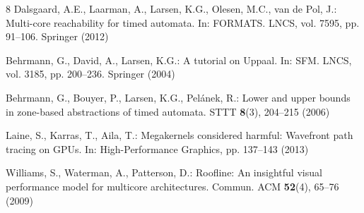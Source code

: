 \documentclass[11pt]{article}
\begin{document}
\begin{thebibliography}{8}
Dalsgaard, A.E., Laarman, A., Larsen, K.G., Olesen, M.C., van de Pol, J.:
Multi-core reachability for timed automata. In: FORMATS. LNCS, vol. 7595, pp. 91--106.
Springer (2012)

Behrmann, G., David, A., Larsen, K.G.: A tutorial on Uppaal. In: SFM. LNCS, vol. 3185,
pp. 200--236. Springer (2004)

Behrmann, G., Bouyer, P., Larsen, K.G., Pel\'{a}nek, R.: Lower and upper bounds in zone-based
abstractions of timed automata. STTT \textbf{8}(3), 204--215 (2006)

Laine, S., Karras, T., Aila, T.: Megakernels considered harmful: Wavefront path tracing on
GPUs. In: High-Performance Graphics, pp. 137--143 (2013)

Williams, S., Waterman, A., Patterson, D.: Roofline: An insightful visual performance model
for multicore architectures. Commun. ACM \textbf{52}(4), 65--76 (2009)
\end{thebibliography}
\end{document}
